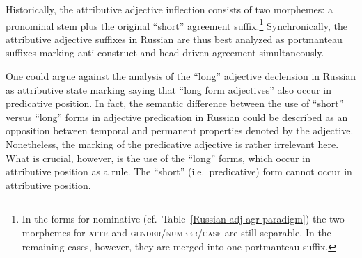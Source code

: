 Historically, the attributive adjective inflection consists of two morphemes: a pronominal stem plus the original “short” agreement suffix.\footnote{In the forms for nominative (cf.~Table~\ref{Russian adj agr paradigm}) the two morphemes for \textsc{attr} and \textsc{gender/number/case} are still separable. In the remaining cases, however, they are merged into one portmanteau suffix.} Synchronically, the attributive adjective suffixes in Russian are thus best analyzed as portmanteau suffixes marking anti\hyp{}construct and head\hyp{}driven agreement simultaneously.

One could argue against the analysis of the “long” adjective declension in Russian as attributive state marking saying that “long form adjectives” also occur in predicative position. In fact, the semantic difference between the use of “short” versus “long” forms in adjective predication in Russian could be described as an opposition between temporal and permanent properties denoted by the adjective.
Nonetheless, the marking of the predicative adjective is rather irrelevant here. What is crucial, however, is the use of the “long” forms, which occur in attributive position as a rule. The “short” (i.e.~predicative) form cannot occur in attributive position.

